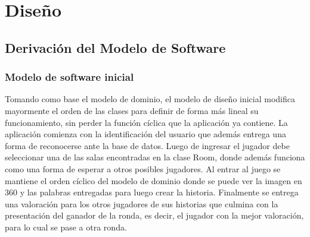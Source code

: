\documentclass[12pt]{article}
\makeatletter
\renewcommand\paragraph{\@startsection{paragraph}{4}{\z@}%
	{-2.5ex\@plus -1ex \@minus -.25ex}%
	{1.25ex \@plus .25ex}%
	{\normalfont\normalsize\bfseries}}
\makeatother
\begin{document}
\newpage



\newpage


\newpage


\newpage



\newpage
\section{Diseño}

\subsection{Derivación del Modelo de Software}
\subsubsection{Modelo de software inicial}
Tomando como base el modelo de dominio, el modelo de diseño inicial modifica mayormente el orden de las clases para definir de forma más lineal su funcionamiento, sin perder la función cíclica que la aplicación ya contiene.
La aplicación comienza con la identificación del usuario que además entrega una forma de reconocerse ante la base de datos. Luego de ingresar el jugador debe seleccionar una de las salas encontradas en la clase Room, donde además funciona como una forma de esperar a otros posibles jugadores. Al entrar al juego se mantiene el orden cíclico del modelo de dominio donde se puede ver la imagen en 360 y las palabras entregadas para luego crear la historia. Finalmente se entrega una valoración para los otros jugadores de sus historias que culmina con la presentación del ganador de la ronda, es decir, el jugador con la mejor valoración, para lo cual se pase a otra ronda.
\end{document}
